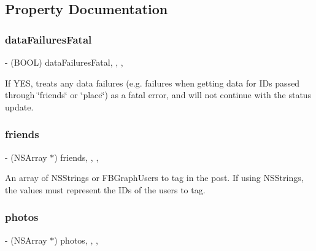 \subsection{Property Documentation}
\mbox{\label{interfaceFBPhotoParams_a34bfb005e05464a861ea96ce7e532b44}} 
\subsubsection{\texorpdfstring{data\+Failures\+Fatal}{dataFailuresFatal}}
{\footnotesize\ttfamily -\/ (B\+O\+OL) data\+Failures\+Fatal\hspace{0.3cm}{\ttfamily [read]}, {\ttfamily [write]}, {\ttfamily [nonatomic]}, {\ttfamily [assign]}}

If Y\+ES, treats any data failures (e.\+g. failures when getting data for I\+Ds passed through \char`\"{}friends\char`\"{} or \char`\"{}place\char`\"{}) as a fatal error, and will not continue with the status update. \mbox{\label{interfaceFBPhotoParams_a7c7882485d0b683202f3f0a30518a4a0}} 
\subsubsection{\texorpdfstring{friends}{friends}}
{\footnotesize\ttfamily -\/ (N\+S\+Array $\ast$) friends\hspace{0.3cm}{\ttfamily [read]}, {\ttfamily [write]}, {\ttfamily [nonatomic]}, {\ttfamily [copy]}}

An array of N\+S\+Strings or F\+B\+Graph\+Users to tag in the post. If using N\+S\+Strings, the values must represent the I\+Ds of the users to tag. \mbox{\label{interfaceFBPhotoParams_a38a64b6d4b61d659f517ec246b26eedb}} 
\subsubsection{\texorpdfstring{photos}{photos}}
{\footnotesize\ttfamily -\/ (N\+S\+Array $\ast$) photos\hspace{0.3cm}{\ttfamily [read]}, {\ttfamily [write]}, {\ttfamily [nonatomic]}, {\ttfamily [copy]}}

